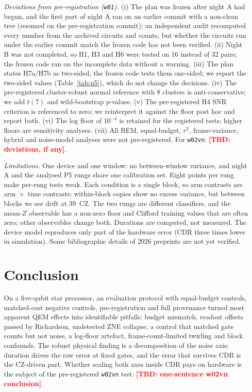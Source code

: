 \documentclass[conference]{IEEEtran}
\newcommand{\TBD}[1]{\textcolor{red}{\textbf{[TBD: #1]}}}
\begin{document}
\emph{Deviations from pre-registration (\texttt{w01}).} (i) The plan was frozen after night A
had begun, and the first part of night A ran on an earlier commit with a non-clean tree
(resumed on the pre-registration commit); an independent audit recomputed every number from the
archived circuits and counts, but whether the circuits run under the earlier commit match the
frozen code has not been verified.
(ii) Night B was not completed, so H1, H3 and H6 were tested on 16 instead of 32 pairs; the
frozen code ran on the incomplete data without a warning. (iii) The plan states H7a/H7b as
two-sided, the frozen code tests them one-sided; we report the two-sided values
(Table~\ref{tab:p5}), which do not change the decisions. (iv) The pre-registered cluster-robust
normal reference with 8 clusters is anti-conservative; we add $t(7)$ and wild-bootstrap
$p$-values. (v) The pre-registered H4 SNR criterion is referenced to zero; we reinterpret it
against the floor post hoc and report both. (vi) The log floor of $10^{-4}$ is retained for
the registered tests; higher floors are sensitivity analyses. (vii) All REM, equal-budget,
$r^2$, frame-variance, hybrid and noise-model analyses were not pre-registered. For
\texttt{w02vn}: \TBD{deviations, if any}.

\emph{Limitations.} One device and one window: no between-window variance, and night A and the
analysed P5 rungs share one calibration set. Eight points per rung make per-rung tests weak.
Each condition is a single block, so arm contrasts are arm~$\times$~time contrasts; within-block
copies show no excess variance, but between blocks we see drift at 39~CZ. The two rungs are
different classifiers, and the mean-$Z$ observable has a non-zero floor and Clifford training
values that are often zero; other observables change both. Durations are computed, not
measured. The device model reproduces only part of the hardware error (CDR three times lower in
simulation). Some bibliographic details of 2026 preprints are not yet verified.

\section{Conclusion}
On a five-qubit star processor, an evaluation protocol with equal-budget controls,
matched-cost negative controls, pre-registration and full provenance turned most apparent QEM
effects into identifiable pitfalls: budget mismatch, readout offsets passed by Richardson,
undetected ZNE collapse, a control that matched gate counts but not noise, a log-floor
artefact, frame-count-limited twirling and block confounds. The robust physical finding is a
decomposition of the noise axis: duration drives the raw error at fixed gates, and the error
that survives CDR is the CZ-driven part. Whether scaling both axes inside CDR pays on hardware
is the subject of the pre-registered \texttt{w02vn} test: \TBD{one-sentence w02vn conclusion}.
\end{document}
